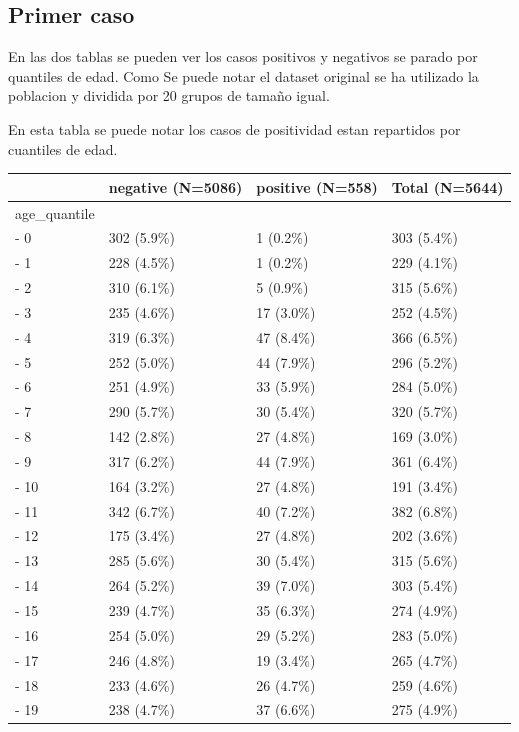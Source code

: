 \documentclass[
]{article}
\begin{document}
\hypertarget{primer-caso}{%
\subsection{Primer caso}\label{primer-caso}}

En las dos tablas se pueden ver los casos positivos y negativos se
parado por quantiles de edad. Como Se puede notar el dataset original se
ha utilizado la poblacion y dividida por 20 grupos de tamaño igual.

En esta tabla se puede notar los casos de positividad estan repartidos
por cuantiles de edad.

\begin{longtable}[]{@{}llll@{}}
\toprule()
& negative (N=5086) & positive (N=558) & Total (N=5644) \\
\midrule()
\endhead
age\_quantile & & & \\
- 0 & 302 (5.9\%) & 1 (0.2\%) & 303 (5.4\%) \\
- 1 & 228 (4.5\%) & 1 (0.2\%) & 229 (4.1\%) \\
- 2 & 310 (6.1\%) & 5 (0.9\%) & 315 (5.6\%) \\
- 3 & 235 (4.6\%) & 17 (3.0\%) & 252 (4.5\%) \\
- 4 & 319 (6.3\%) & 47 (8.4\%) & 366 (6.5\%) \\
- 5 & 252 (5.0\%) & 44 (7.9\%) & 296 (5.2\%) \\
- 6 & 251 (4.9\%) & 33 (5.9\%) & 284 (5.0\%) \\
- 7 & 290 (5.7\%) & 30 (5.4\%) & 320 (5.7\%) \\
- 8 & 142 (2.8\%) & 27 (4.8\%) & 169 (3.0\%) \\
- 9 & 317 (6.2\%) & 44 (7.9\%) & 361 (6.4\%) \\
- 10 & 164 (3.2\%) & 27 (4.8\%) & 191 (3.4\%) \\
- 11 & 342 (6.7\%) & 40 (7.2\%) & 382 (6.8\%) \\
- 12 & 175 (3.4\%) & 27 (4.8\%) & 202 (3.6\%) \\
- 13 & 285 (5.6\%) & 30 (5.4\%) & 315 (5.6\%) \\
- 14 & 264 (5.2\%) & 39 (7.0\%) & 303 (5.4\%) \\
- 15 & 239 (4.7\%) & 35 (6.3\%) & 274 (4.9\%) \\
- 16 & 254 (5.0\%) & 29 (5.2\%) & 283 (5.0\%) \\
- 17 & 246 (4.8\%) & 19 (3.4\%) & 265 (4.7\%) \\
- 18 & 233 (4.6\%) & 26 (4.7\%) & 259 (4.6\%) \\
- 19 & 238 (4.7\%) & 37 (6.6\%) & 275 (4.9\%) \\
\bottomrule()
\end{longtable}
\end{document}
